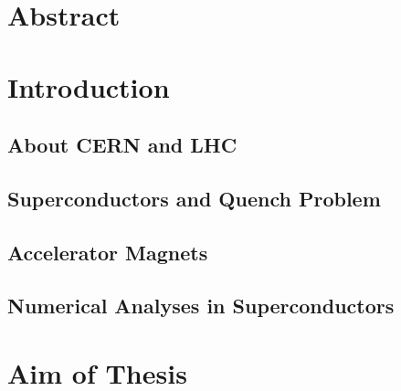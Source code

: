 \documentclass[11pt,a4paper]{report}
\begin{document}


\clearpage\thispagestyle{empty}
\chapter*{Abstract}
\thispagestyle{empty}


% 

\clearpage
\setcounter{page}{1}
\tableofcontents
\clearpage

\chapter{Introduction}
\label{chapter: introduction}

\section{About CERN and LHC}
\label{section: about cern}


\section{Superconductors and Quench Problem}
\label{section: superconductors}


\section{Accelerator Magnets}
\label{section: accelerator_magnets}


\section{Numerical Analyses in Superconductors}
\label{section: numerical_analyses_in_superconductors}


\clearpage \thispagestyle{empty}
\chapter{Aim of Thesis}
\label{chapter: aim_thesis}
\end{document}
